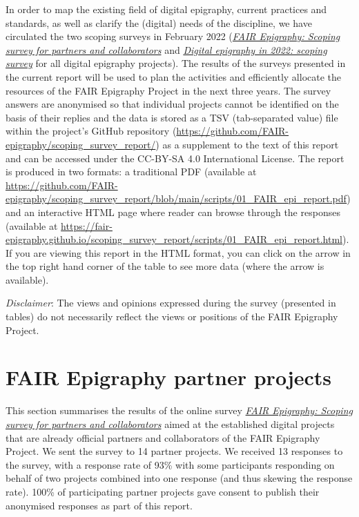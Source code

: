 \documentclass[
  12pt,
]{scrreprt}
\begin{document}
In order to map the existing field of digital epigraphy, current
practices and standards, as well as clarify the (digital) needs of the
discipline, we have circulated the two scoping surveys in February 2022
(\href{https://github.com/FAIR-epigraphy/scoping_survey_report/data/01_Survey_partners_questions.pdf}{\emph{FAIR
Epigraphy: Scoping survey for partners and collaborators}} and
\href{https://github.com/FAIR-epigraphy/scoping_survey_report/data/02_Survey_projects_questions.pdf}{\emph{Digital
epigraphy in 2022: scoping survey}} for all digital epigraphy projects).
The results of the surveys presented in the current report will be used
to plan the activities and efficiently allocate the resources of the
FAIR Epigraphy Project in the next three years. The survey answers are
anonymised so that individual projects cannot be identified on the basis
of their replies and the data is stored as a TSV (tab-separated value)
file within the project's GitHub repository
(\url{https://github.com/FAIR-epigraphy/scoping_survey_report/}) as a
supplement to the text of this report and can be accessed under the
CC-BY-SA 4.0 International License. The report is produced in two
formats: a traditional PDF (available at
\url{https://github.com/FAIR-epigraphy/scoping_survey_report/blob/main/scripts/01_FAIR_epi_report.pdf})
and an interactive HTML page where reader can browse through the
responses (available at
\url{https://fair-epigraphy.github.io/scoping_survey_report/scripts/01_FAIR_epi_report.html}).
If you are viewing this report in the HTML format, you can click on the
arrow in the top right hand corner of the table to see more data (where
the arrow is available).

\emph{Disclaimer}: The views and opinions expressed during the survey
(presented in tables) do not necessarily reflect the views or positions
of the FAIR Epigraphy Project.

\hypertarget{fair-epigraphy-partner-projects}{%
\chapter{FAIR Epigraphy partner
projects}\label{fair-epigraphy-partner-projects}}

This section summarises the results of the online survey
\href{https://github.com/FAIR-epigraphy/scoping_survey_report/data/01_Survey_partners_questions.pdf}{\emph{FAIR
Epigraphy: Scoping survey for partners and collaborators}} aimed at the
established digital projects that are already official partners and
collaborators of the FAIR Epigraphy Project. We sent the survey to 14
partner projects. We received 13 responses to the survey, with a
response rate of 93\% with some participants responding on behalf of two
projects combined into one response (and thus skewing the response
rate). 100\% of participating partner projects gave consent to publish
their anonymised responses as part of this report.
\end{document}
